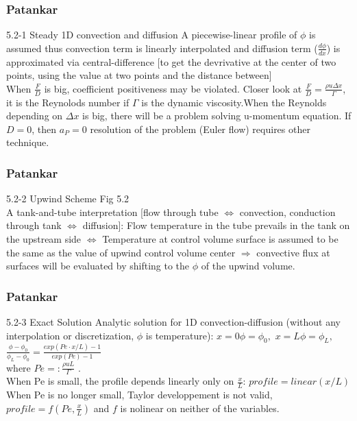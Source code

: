 \documentclass{beamer}
\begin{document}
\begin{frame}
\frametitle{Patankar}
\begin{block}{5.2-1 Steady 1D convection and diffusion}
	A piecewise-linear profile of $\phi$ is assumed thus convection term is linearly interpolated and diffusion term ($\frac{d\phi}{dx}$) is approximated via central-difference [to get the devrivative at the center of two points, using the value at two points and the distance between] \\
	When $\frac{F}{D}$ is big, coefficient positiveness may be violated. Closer look at $\frac{F}{D} = \frac{\rho u \Delta x}{\Gamma}$, it is the Reynolods number if $\Gamma$ is the dynamic viscosity.When the Reynolds depending on $\Delta x$ is big, there will be a problem solving u-momentum equation. If $D=0$, then $a_P=0$ resolution of the problem (Euler flow) requires other technique.
\end{block}
\end{frame}


\begin{frame}
\frametitle{Patankar}
\begin{block}{5.2-2 Upwind Scheme}
	Fig 5.2\\
	A tank-and-tube interpretation [flow through tube $\iff$ convection, conduction through tank $\iff$ diffusion]: Flow temperature in the tube prevails in the tank on the upstream side $\iff$ Temperature at control volume surface is assumed to be the same as the value of upwind control volume center $\Rightarrow$ convective flux at surfaces will be evaluated by shifting to the $\phi$ of the upwind volume. 
\end{block}
\end{frame}


\begin{frame}
\frametitle{Patankar}
\begin{block}{5.2-3 Exact Solution}
	Analytic solution for 1D convection-diffusion (without any interpolation or discretization, $\phi$ is temperature):
$	 x=0  \phi=\phi_0, $ 
$	 x=L  \phi=\phi_L, $ 
$	 \frac{\phi - \phi_0}{\phi_L-\phi_0} = \frac{exp(Pe \cdot x/L)-1}{exp(Pe)-1}$ \\
	where $Pe=: \frac{\rho u L}{\Gamma}$ .\\
	When Pe is small, the profile depends linearly only on $\frac{x}{L}$: $profile=linear(x/L)$\\
	When Pe is no longer small, Taylor developpement is not valid, $profile=f(Pe,\frac{x}{L})$ and $f$ is nolinear on neither of the variables.\\

\end{block}
\end{frame}
\end{document}
